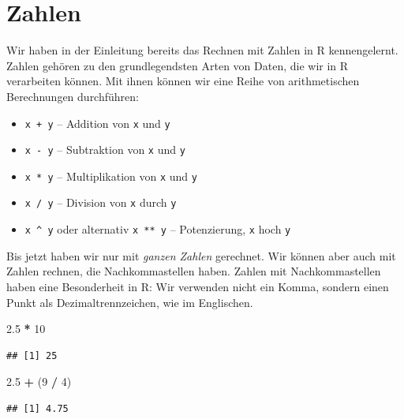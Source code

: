 \documentclass[
  ngerman,
]{book}
\newenvironment{Shaded}{\begin{snugshade}}{\end{snugshade}}
\newcommand{\DecValTok}[1]{\textcolor[rgb]{0.00,0.00,0.81}{#1}}
\newcommand{\FloatTok}[1]{\textcolor[rgb]{0.00,0.00,0.81}{#1}}
\newcommand{\NormalTok}[1]{#1}
\newcommand{\SpecialCharTok}[1]{\textcolor[rgb]{0.81,0.36,0.00}{\textbf{#1}}}
\providecommand{\tightlist}{%
  \setlength{\itemsep}{0pt}\setlength{\parskip}{0pt}}
\begin{document}
\section{Zahlen}\label{zahlen}

Wir haben in der Einleitung bereits das Rechnen mit Zahlen in R kennengelernt. Zahlen gehören zu den grundlegendsten Arten von Daten, die wir in R verarbeiten können. Mit ihnen können wir eine Reihe von arithmetischen Berechnungen durchführen:

\begin{itemize}
\tightlist
\item
  \texttt{x\ +\ y} -- Addition von \texttt{x} und \texttt{y}
\item
  \texttt{x\ -\ y} -- Subtraktion von \texttt{x} und \texttt{y}
\item
  \texttt{x\ *\ y} -- Multiplikation von \texttt{x} und \texttt{y}
\item
  \texttt{x\ /\ y} -- Division von \texttt{x} durch \texttt{y}
\item
  \texttt{x\ \^{}\ y} oder alternativ \texttt{x\ **\ y} -- Potenzierung, \texttt{x} hoch \texttt{y}
\end{itemize}

Bis jetzt haben wir nur mit \emph{ganzen Zahlen} gerechnet. Wir können aber auch mit Zahlen rechnen, die Nachkommastellen haben. Zahlen mit Nachkommastellen haben eine Besonderheit in R: Wir verwenden nicht ein Komma, sondern einen Punkt als Dezimaltrennzeichen, wie im Englischen.

\begin{Shaded}
\begin{Highlighting}[]
\FloatTok{2.5} \SpecialCharTok{*} \DecValTok{10}
\end{Highlighting}
\end{Shaded}

\begin{verbatim}
## [1] 25
\end{verbatim}

\begin{Shaded}
\begin{Highlighting}[]
\FloatTok{2.5} \SpecialCharTok{+}\NormalTok{ (}\DecValTok{9} \SpecialCharTok{/} \DecValTok{4}\NormalTok{)}
\end{Highlighting}
\end{Shaded}

\begin{verbatim}
## [1] 4.75
\end{verbatim}
\end{document}
